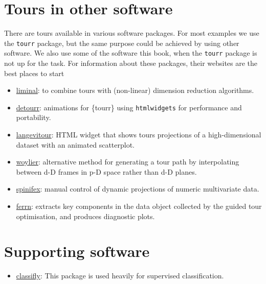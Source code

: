 \documentclass[
  letterpaper,
]{krantz}
\providecommand{\tightlist}{%
  \setlength{\itemsep}{0pt}\setlength{\parskip}{0pt}}\usepackage{longtable,booktabs,array}
\begin{document}
\section{Tours in other software}\label{tours-in-other-software}

There are tours available in various software packages. For most
examples we use the \texttt{tourr} package, but the same purpose could
be achieved by using other software. We also use some of the software
this book, when the \texttt{tourr} package is not up for the task. For
information about these packages, their websites are the best places to
start

\begin{itemize}
\tightlist
\item
  \href{https://sa-lee.github.io/liminal/}{liminal}: to combine tours
  with (non-linear) dimension reduction algorithms.
\item
  \href{https://casperhart.github.io/detourr/}{detourr}: animations for
  \{tourr\} using \texttt{htmlwidgets} for performance and portability.
\item
  \href{https://logarithmic.net/langevitour/}{langevitour}: HTML widget
  that shows tours projections of a high-dimensional dataset with an
  animated scatterplot.
\item
  \href{https://numbats.github.io/woylier/}{woylier}: alternative method
  for generating a tour path by interpolating between d-D frames in p-D
  space rather than d-D planes.
\item
  \href{https://nspyrison.github.io/spinifex/}{spinifex}: manual control
  of dynamic projections of numeric multivariate data.
\item
  \href{https://huizezhang-sherry.github.io/ferrn/}{ferrn}: extracts key
  components in the data object collected by the guided tour
  optimisation, and produces diagnostic plots.
\end{itemize}

\section{Supporting software}\label{supporting-software}

\begin{itemize}
\tightlist
\item
  \href{https://github.com/hadley/classifly}{classifly}: This package is
  used heavily for supervised classification.
\end{itemize}
\end{document}
